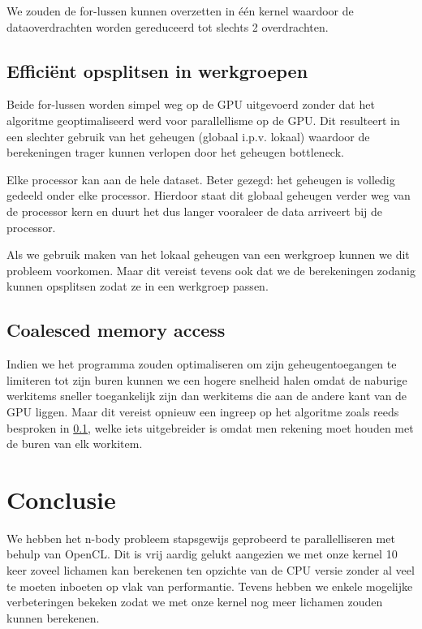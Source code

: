 \documentclass{article}
\begin{document}
We zouden de for-lussen kunnen overzetten in \'{e}\'{e}n kernel waardoor de dataoverdrachten
worden gereduceerd tot slechts 2 overdrachten.

\subsection{Effici\"{e}nt opsplitsen in werkgroepen}
\label{hfd:werkgroepen}
Beide for-lussen worden simpel weg op de GPU uitgevoerd zonder dat het algoritme
geoptimaliseerd werd voor parallellisme op de GPU. Dit resulteert in een slechter
gebruik van het geheugen (globaal i.p.v. lokaal) waardoor de berekeningen trager
kunnen verlopen door het geheugen bottleneck.

Elke processor kan aan de hele dataset. Beter gezegd: het geheugen is volledig
gedeeld onder elke processor. Hierdoor staat dit globaal geheugen verder weg
van de processor kern en duurt het dus langer vooraleer de data arriveert bij
de processor.

Als we gebruik maken van het lokaal geheugen van een werkgroep kunnen we dit probleem
voorkomen. Maar dit vereist tevens ook dat we de berekeningen zodanig kunnen opsplitsen
zodat ze in een werkgroep passen.

\subsection{Coalesced memory access}
Indien we het programma zouden optimaliseren om zijn geheugentoegangen te limiteren
tot zijn buren kunnen we een hogere snelheid halen omdat de naburige werkitems
sneller toegankelijk zijn dan werkitems die aan de andere kant van de GPU liggen.
Maar dit vereist opnieuw een ingreep op het algoritme zoals reeds besproken in
\ref{hfd:werkgroepen}, welke iets uitgebreider is omdat men rekening moet houden
met de buren van elk workitem.

\section{Conclusie}

We hebben het n-body probleem stapsgewijs geprobeerd te parallelliseren met behulp
van OpenCL. Dit is vrij aardig gelukt aangezien we met onze kernel 10 keer zoveel lichamen
kan berekenen ten opzichte van de CPU versie zonder al veel te moeten inboeten op vlak
van performantie. Tevens hebben we enkele mogelijke verbeteringen bekeken zodat we
met onze kernel nog meer lichamen zouden kunnen berekenen.
\end{document}
